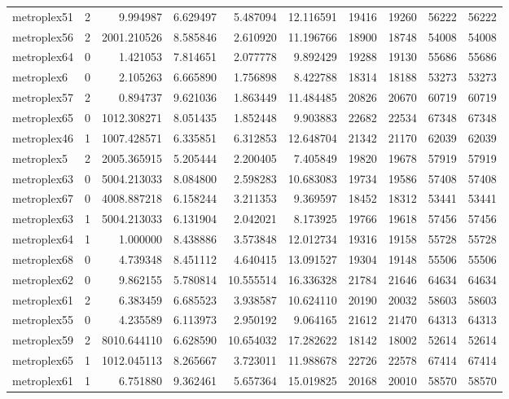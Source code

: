 \begin{longtable}{|l|r|r|r|r|r|r|r|r|r|}
metroplex51 & 2 & 9.994987 & 6.629497 & 5.487094 & 12.116591 & 19416 & 19260 & 56222 & 56222 \\
metroplex56 & 2 & 2001.210526 & 8.585846 & 2.610920 & 11.196766 & 18900 & 18748 & 54008 & 54008 \\
metroplex64 & 0 & 1.421053 & 7.814651 & 2.077778 & 9.892429 & 19288 & 19130 & 55686 & 55686 \\
metroplex6 & 0 & 2.105263 & 6.665890 & 1.756898 & 8.422788 & 18314 & 18188 & 53273 & 53273 \\
metroplex57 & 2 & 0.894737 & 9.621036 & 1.863449 & 11.484485 & 20826 & 20670 & 60719 & 60719 \\
metroplex65 & 0 & 1012.308271 & 8.051435 & 1.852448 & 9.903883 & 22682 & 22534 & 67348 & 67348 \\
metroplex46 & 1 & 1007.428571 & 6.335851 & 6.312853 & 12.648704 & 21342 & 21170 & 62039 & 62039 \\
metroplex5 & 2 & 2005.365915 & 5.205444 & 2.200405 & 7.405849 & 19820 & 19678 & 57919 & 57919 \\
metroplex63 & 0 & 5004.213033 & 8.084800 & 2.598283 & 10.683083 & 19734 & 19586 & 57408 & 57408 \\
metroplex67 & 0 & 4008.887218 & 6.158244 & 3.211353 & 9.369597 & 18452 & 18312 & 53441 & 53441 \\
metroplex63 & 1 & 5004.213033 & 6.131904 & 2.042021 & 8.173925 & 19766 & 19618 & 57456 & 57456 \\
metroplex64 & 1 & 1.000000 & 8.438886 & 3.573848 & 12.012734 & 19316 & 19158 & 55728 & 55728 \\
metroplex68 & 0 & 4.739348 & 8.451112 & 4.640415 & 13.091527 & 19304 & 19148 & 55506 & 55506 \\
metroplex62 & 0 & 9.862155 & 5.780814 & 10.555514 & 16.336328 & 21784 & 21646 & 64634 & 64634 \\
metroplex61 & 2 & 6.383459 & 6.685523 & 3.938587 & 10.624110 & 20190 & 20032 & 58603 & 58603 \\
metroplex55 & 0 & 4.235589 & 6.113973 & 2.950192 & 9.064165 & 21612 & 21470 & 64313 & 64313 \\
metroplex59 & 2 & 8010.644110 & 6.628590 & 10.654032 & 17.282622 & 18142 & 18002 & 52614 & 52614 \\
metroplex65 & 1 & 1012.045113 & 8.265667 & 3.723011 & 11.988678 & 22726 & 22578 & 67414 & 67414 \\
metroplex61 & 1 & 6.751880 & 9.362461 & 5.657364 & 15.019825 & 20168 & 20010 & 58570 & 58570 \\

\end{longtable}
